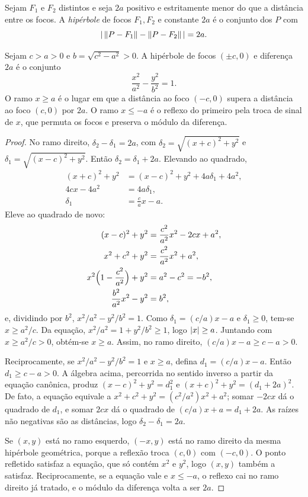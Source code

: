 \documentclass[11pt,a4paper]{article}
\begin{document}
\begin{definicao}
Sejam $F_1$ e $F_2$ distintos e seja $2a$ positivo e estritamente menor do que a distância entre os focos. A \emph{hipérbole} de focos $F_1,F_2$ e constante $2a$ é o conjunto dos $P$ com
\[
\left\lvert \,\left\lVert P-F_1 \right\rVert-\left\lVert P-F_2 \right\rVert\, \right\rvert=2a.
\]
\end{definicao}

\begin{teorema}\label{teo:hiperbole}
Sejam $c>a>0$ e $b=\sqrt{c^2-a^2}>0$. A hipérbole de focos $(\pm c,0)$ e diferença $2a$ é o conjunto
\[
\frac{x^2}{a^2}-\frac{y^2}{b^2}=1.
\]
O ramo $x\ge a$ é o lugar em que a distância ao foco $(-c,0)$ supera a distância ao foco $(c,0)$ por $2a$. O ramo $x\le -a$ é o reflexo do primeiro pela troca de sinal de $x$, que permuta os focos e preserva o módulo da diferença.
\end{teorema}

\begin{proof}
No ramo direito, $\delta_2-\delta_1=2a$, com $\delta_2=\sqrt{(x+c)^2+y^2}$ e $\delta_1=\sqrt{(x-c)^2+y^2}$. Então $\delta_2=\delta_1+2a$. Elevando ao quadrado,
\begin{align*}
(x+c)^2+y^2&=(x-c)^2+y^2+4a\delta_1+4a^2,\\
4cx-4a^2&=4a\delta_1,\\
\delta_1&=\frac{c}{a}x-a.
\end{align*}
Eleve ao quadrado de novo:
\begin{align*}
(x-c)^2+y^2&=\frac{c^2}{a^2}x^2-2cx+a^2,\\
x^2+c^2+y^2&=\frac{c^2}{a^2}x^2+a^2,\\
x^2\Bigl(1-\frac{c^2}{a^2}\Bigr)+y^2&=a^2-c^2=-b^2,\\
\frac{b^2}{a^2}x^2-y^2&=b^2,
\end{align*}
e, dividindo por $b^2$, $x^2/a^2-y^2/b^2=1$. Como $\delta_1=(c/a)x-a$ e $\delta_1\ge 0$, tem-se $x\ge a^2/c$. Da equação, $x^2/a^2=1+y^2/b^2\ge 1$, logo $\left\lvert x \right\rvert\ge a$. Juntando com $x\ge a^2/c>0$, obtém-se $x\ge a$. Assim, no ramo direito, $(c/a)x-a\ge c-a>0$.

Reciprocamente, se $x^2/a^2-y^2/b^2=1$ e $x\ge a$, defina $d_1=(c/a)x-a$. Então $d_1\ge c-a>0$. A álgebra acima, percorrida no sentido inverso a partir da equação canônica, produz $(x-c)^2+y^2=d_1^2$ e $(x+c)^2+y^2=(d_1+2a)^2$. De fato, a equação equivale a $x^2+c^2+y^2=(c^2/a^2)x^2+a^2$; somar $-2cx$ dá o quadrado de $d_1$, e somar $2cx$ dá o quadrado de $(c/a)x+a=d_1+2a$. As raízes não negativas são as distâncias, logo $\delta_2-\delta_1=2a$.

Se $(x,y)$ está no ramo esquerdo, $(-x,y)$ está no ramo direito da mesma hipérbole geométrica, porque a reflexão troca $(c,0)$ com $(-c,0)$. O ponto refletido satisfaz a equação, que só contém $x^2$ e $y^2$, logo $(x,y)$ também a satisfaz. Reciprocamente, se a equação vale e $x\le -a$, o reflexo cai no ramo direito já tratado, e o módulo da diferença volta a ser $2a$.
\end{proof}
\end{document}
